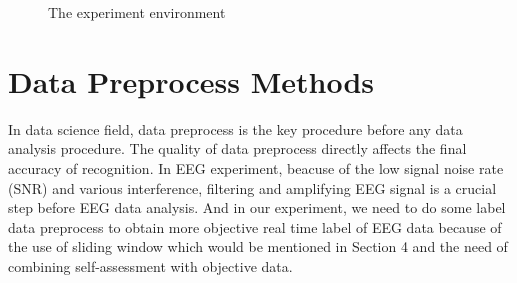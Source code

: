 \documentclass[runningheads,a4paper]{llncs}
\begin{document}
\begin{figure}
  \centering
  \hspace{0.5in}

  \hspace{0.5in}
  \caption{The experiment environment}
  \label{fig:experiment} %
\end{figure}

\section{Data Preprocess Methods}
In data science field, data preprocess is the key procedure before any data analysis
procedure. The quality of data preprocess directly affects the final accuracy of
recognition. In EEG experiment, beacuse of the low signal noise rate (SNR) and
various interference, filtering and amplifying EEG signal is a crucial step before
EEG data analysis. And in our experiment, we need to do some label data preprocess
to obtain more objective real time label of EEG data because of the use of sliding window which would
be mentioned in Section 4 and the need of combining self-assessment with objective data.
\end{document}
